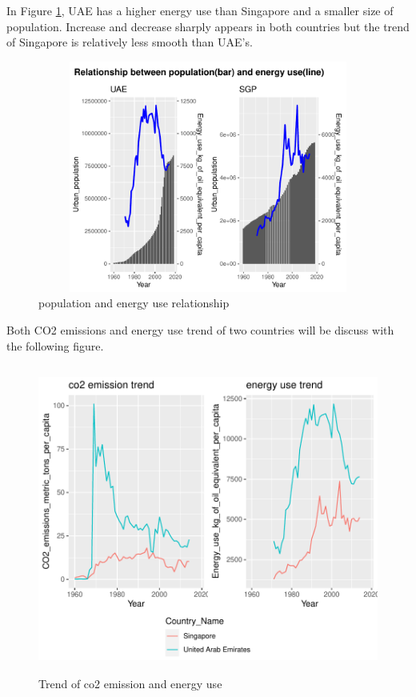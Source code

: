 \documentclass[11pt,a4paper,]{article}
\begin{document}
In Figure \ref{fig:uae-sgp-energy-pop}, UAE has a higher energy use than Singapore and a smaller size of population. Increase and decrease sharply appears in both countries but the trend of Singapore is relatively less smooth than UAE's.

\begin{figure}[H]
\includegraphics[width=7in, height = 3in]{Figures/uae-sgp-energy-pop-1}
\caption{population and energy use relationship}
\label{fig:uae-sgp-energy-pop}
\end{figure}

Both CO2 emissions and energy use trend of two countries will be discuss with the following figure.

\begin{figure}[H]
\includegraphics[width=7in, height = 4in]{Figures/uae-sgp-trend-1}
\caption{Trend of co2 emission and energy use}
\label{fig:uae-sgp-trend}
\end{figure}
\end{document}
